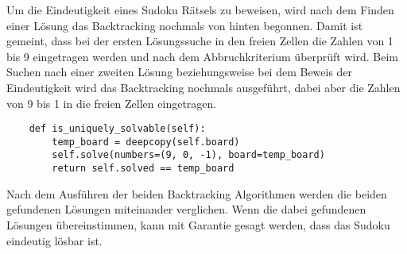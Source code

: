 Um die Eindeutigkeit eines Sudoku Rätsels zu beweisen, wird nach dem Finden einer Lösung das Backtracking nochmals von hinten begonnen. Damit ist gemeint, dass bei der ersten Lösungssuche in den freien Zellen die Zahlen von 1 bis 9 eingetragen werden und nach dem Abbruchkriterium überprüft wird. Beim Suchen nach einer zweiten Lösung beziehungsweise bei dem Beweis der Eindeutigkeit wird das Backtracking nochmals ausgeführt, dabei aber die Zahlen von 9 bis 1 in die freien Zellen eingetragen.

\begin{lstlisting}
	def is_uniquely_solvable(self):
		temp_board = deepcopy(self.board)
		self.solve(numbers=(9, 0, -1), board=temp_board)
		return self.solved == temp_board
\end{lstlisting}

Nach dem Ausführen der beiden Backtracking Algorithmen werden die beiden gefundenen Lösungen miteinander verglichen. Wenn die dabei gefundenen Lösungen übereinstimmen, kann mit Garantie gesagt werden, dass das Sudoku eindeutig lösbar ist.

